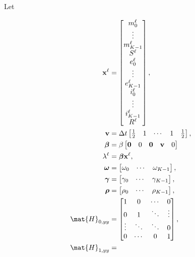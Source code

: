 \documentclass{jpmarticle}
\renewcommand{\vec}[1]{\boldsymbol{\mathrm{#1}}}
\let\subequationsorig\subequations%
\let\endsubequationsorig\endsubequations%
\renewenvironment{subequations}{
  \subequationsorig
  \renewcommand{\theequation}{\theparentequation.\arabic{equation}}
}{
  \endsubequationsorig
}
\begin{document}
Let
\begin{subequations}
  \begin{align}
    \vec{x}^{\ell} &=
    \begin{bmatrix}
      m_0^{\ell} \\ \vdots \\ m_{K - 1}^{\ell} \\
      S^{\ell} \\
      e_0^{\ell} \\ \vdots \\ e_{K - 1}^{\ell} \\
      i_0^{\ell} \\ \vdots \\ i_{K - 1}^{\ell} \\
      R^{\ell}
    \end{bmatrix},
    \\
    \vec{v} &=
    \Delta t
    \begin{bmatrix}
      \frac{1}{2} & 1 & \cdots & 1 & \frac{1}{2}
    \end{bmatrix},
    \\
    \vec{\beta} &=
    \beta
    \begin{bmatrix}
      \vec{0} & 0 & \vec{0} & \vec{v} & 0
    \end{bmatrix}
    \\
    \lambda^{\ell} &=
    \vec{\beta} \vec{x}^{\ell},
    \\
    \vec{\omega} &=
    \begin{bmatrix}
      \omega_0 & \cdots & \omega_{K - 1}
    \end{bmatrix},
    \\
    \vec{\gamma} &=
    \begin{bmatrix}
      \gamma_0 & \cdots & \gamma_{K - 1}
    \end{bmatrix},
    \\
    \vec{\rho} &=
    \begin{bmatrix}
      \rho_0 & \cdots & \rho_{K - 1}
    \end{bmatrix},
    \\
    \mat{H}_{0, yy} &=
    \begin{bmatrix}
      1 & 0 & \cdots & 0 \\
      0 & 1 & \ddots & \vdots \\
      \vdots & \ddots & \ddots & 0 \\
      0 & \cdots & 0 & 1
    \end{bmatrix},
    \\
    \mat{H}_{1, yy} &=

\end{align}
\end{subequations}
\end{document}
